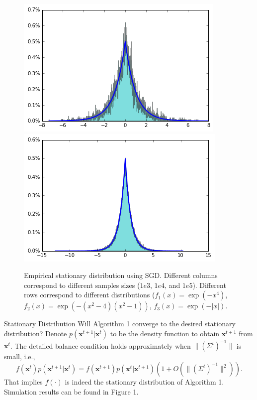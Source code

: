 \documentclass[final]{beamer}
\newlength{\onecolwid}
\newcommand{\bx}{\mathbf{x}}
\begin{document}
\begin{frame}[t]
\begin{columns}[t]
\begin{column}{\onecolwid}
\begin{figure}
    \includegraphics[width=.33\onecolwid]{../figure/case3_step_0.005_iter_1e4.png}
    \includegraphics[width=.33\onecolwid]{../figure/case3_step_0.005_iter_1e5.png}
    \caption{Empirical stationary distribution using SGD. Different columns correspond to different samples sizes ($1e3$, $1e4$, and $1e5$). Different rows correspond to different distributions ($f_1(x) = \exp(-x^4)$, $f_2(x) = \exp(-(x^2 - 4)(x^2 - 1))$, $f_3(x) = \exp(-|x|)$.}
    \label{Fig:exp1}
\end{figure}

\begin{block}{Stationary Distribution}
Will Algorithm 1 converge to the desired stationary distribution? Denote $p(\bx^{t+1}|\bx^t)$ to be the density function to obtain $\bx^{t+1}$ from $\bx^{t}$.
The detailed balance condition holds approximately when $\|(\Sigma^t)^{-1}\|$ is small, i.e.,
\[
f(\bx^{t})p(\bx^{t+1}|\bx^t) = f(\bx^{t+1})p(\bx^{t}|\bx^{t+1}) ( 1 + O(\|(\Sigma^t)^{-1}\|^2)).
\]
That implies $f(\cdot)$ is indeed the stationary distribution of Algorithm 1. Simulation results can be found in Figure 1.
\end{block}



\end{column}
\end{columns}
\end{frame}
\end{document}
